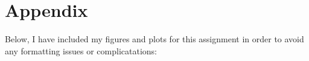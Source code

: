 \documentclass{article}\usepackage[]{graphicx}\usepackage[]{xcolor}
\begin{document}
\begin{multicols}{2}
\vspace{2em}



\begin{tiny}

\end{tiny}
\end{multicols}


\section{Appendix}
Below, I have included my figures and plots for this assignment in order to avoid any formatting issues or complicatations:
\end{document}
